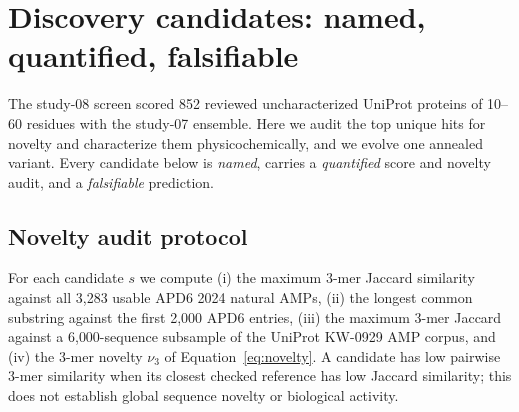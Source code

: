 \section{Discovery candidates: named, quantified, falsifiable}
\label{sec:candidates}

The study-08 screen scored 852 reviewed uncharacterized UniProt proteins of
10--60 residues with the study-07 ensemble. Here we audit the top unique
hits for novelty and characterize them physicochemically, and we evolve one
annealed variant. Every candidate below is \emph{named}, carries a
\emph{quantified} score and novelty audit, and a \emph{falsifiable}
prediction.

\subsection{Novelty audit protocol}
For each candidate $s$ we compute (i) the maximum 3-mer Jaccard similarity
against all 3{,}283 usable APD6 2024 natural AMPs, (ii) the longest common
substring against the first 2{,}000 APD6 entries, (iii) the maximum 3-mer
Jaccard against a 6{,}000-sequence subsample of the UniProt KW-0929 AMP
corpus, and (iv) the 3-mer novelty $\nu_3$ of
Equation~\eqref{eq:novelty}. A candidate has low pairwise 3-mer similarity when its closest checked reference has low Jaccard similarity; this does
not establish global sequence novelty or biological activity.

